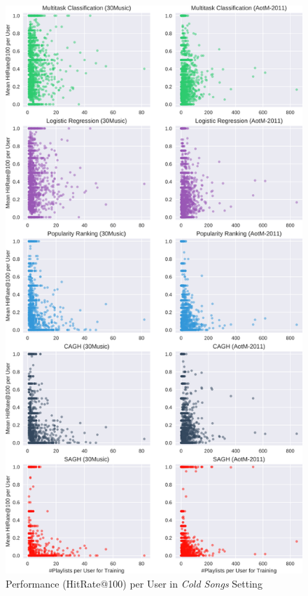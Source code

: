 \begin{figure}[!t]
    \centering
    \includegraphics[height=\textheight]{fig/hitrate_per_user0.png}
    \caption{Performance (HitRate@100) per User in \emph{Cold Songs} Setting}
\end{figure}

